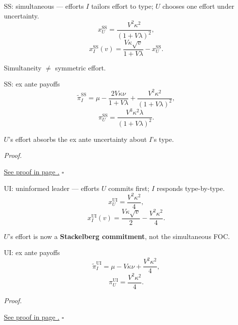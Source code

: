 \documentclass[10pt]{beamer}
\newcommand{\pt}{\widetilde{\pi}}
\newcommand{\rSS}{\mathrm{SS}}
\newcommand{\rUI}{\mathrm{UI}}
\renewenvironment{proof}{%
  \par\smallskip\noindent\textit{Proof.}\hspace{0.6em}\ignorespaces
}{%
  \unskip\nobreak\hfill$\square$\par\smallskip
}
\begin{document}
\begin{frame}{$\rSS$: simultaneous --- efforts}
  $I$ tailors effort to type; $U$ chooses one effort under uncertainty.
  \begin{equation}
    x_U^{\rSS} = \dfrac{V^2\kappa^2}{(1+V\lambda)^2},
  \end{equation}
  \begin{equation}
    x_I^{\rSS}(v) = \dfrac{V\kappa\sqrt{v}}{1+V\lambda} - x_U^{\rSS}.
  \end{equation}

  \alert{Simultaneity $\neq$ symmetric effort.}
\end{frame}

\begin{frame}{$\rSS$: ex ante payoffs}
  \begin{equation*}
    \pt_I^{\rSS} = \mu - \dfrac{2V\kappa\nu}{1+V\lambda}
      + \dfrac{V^2\kappa^2}{(1+V\lambda)^2},
  \end{equation*}
  \begin{equation*}
    \pi_U^{\rSS} = \dfrac{V^3\kappa^2\lambda}{(1+V\lambda)^2}.
  \end{equation*}

  $U$'s effort absorbs the ex ante uncertainty about $I$'s type.

  \begin{proof}
    \hyperref[prf:ss]{See proof in page \pageref{prf:ss}.}
  \end{proof}
\end{frame}

\begin{frame}{$\rUI$: uninformed leader --- efforts}
  $U$ commits first; $I$ responds type-by-type.
  \begin{equation}
    x_U^{\rUI} = \dfrac{V^2\kappa^2}{4},
  \end{equation}
  \begin{equation}
    x_I^{\rUI}(v) = \dfrac{V\kappa\sqrt{v}}{2} - \dfrac{V^2\kappa^2}{4}.
  \end{equation}

  $U$'s effort is now a \textbf{Stackelberg commitment}, not the
  simultaneous FOC.
\end{frame}

\begin{frame}{$\rUI$: ex ante payoffs}
  \begin{equation*}
    \pt_I^{\rUI} = \mu - V\kappa\nu + \dfrac{V^2\kappa^2}{4},
  \end{equation*}
  \begin{equation*}
    \pi_U^{\rUI} = \dfrac{V^2\kappa^2}{4}.
  \end{equation*}

  \begin{proof}
    \hyperref[prf:ui]{See proof in page \pageref{prf:ui}.}
  \end{proof}
\end{frame}
\end{document}
